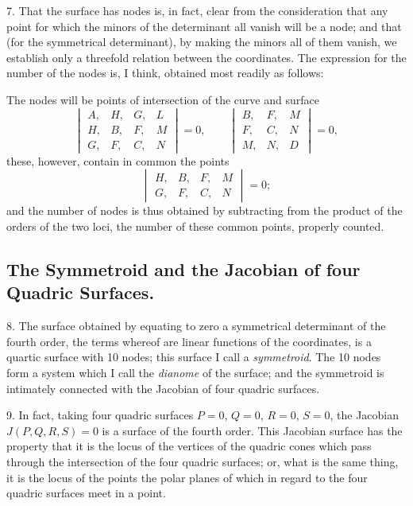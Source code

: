 \documentclass[11pt,a4paper]{article}
\begin{document}
7. That the surface has nodes is, in fact, clear from the consideration that any point for which the minors of the determinant all vanish will be a node; and that (for the symmetrical determinant), by making the minors all of them vanish, we establish only a threefold relation between the coordinates. The expression for the number of the nodes is, I think, obtained most readily as follows:

The nodes will be points of intersection of the curve and surface
\[
\begin{vmatrix}
A, & H, & G, & L \\
H, & B, & F, & M \\
G, & F, & C, & N
\end{vmatrix} = 0,
\qquad
\begin{vmatrix}
B, & F, & M \\
F, & C, & N \\
M, & N, & D
\end{vmatrix} = 0,
\]
these, however, contain in common the points
\[
\begin{vmatrix}
H, & B, & F, & M \\
G, & F, & C, & N
\end{vmatrix} = 0;
\]
and the number of nodes is thus obtained by subtracting from the product of the orders of the two loci, the number of these common points, properly counted.

\subsection*{The Symmetroid and the Jacobian of four Quadric Surfaces.}

8. The surface obtained by equating to zero a symmetrical determinant of the fourth order, the terms whereof are linear functions of the coordinates, is a quartic surface with 10 nodes; this surface I call a \textit{symmetroid}. The 10 nodes form a system which I call the \textit{dianome} of the surface; and the symmetroid is intimately connected with the Jacobian of four quadric surfaces.

9. In fact, taking four quadric surfaces $P = 0$, $Q = 0$, $R = 0$, $S = 0$, the Jacobian $J(P, Q, R, S) = 0$ is a surface of the fourth order. This Jacobian surface has the property that it is the locus of the vertices of the quadric cones which pass through the intersection of the four quadric surfaces; or, what is the same thing, it is the locus of the points the polar planes of which in regard to the four quadric surfaces meet in a point.
\end{document}
